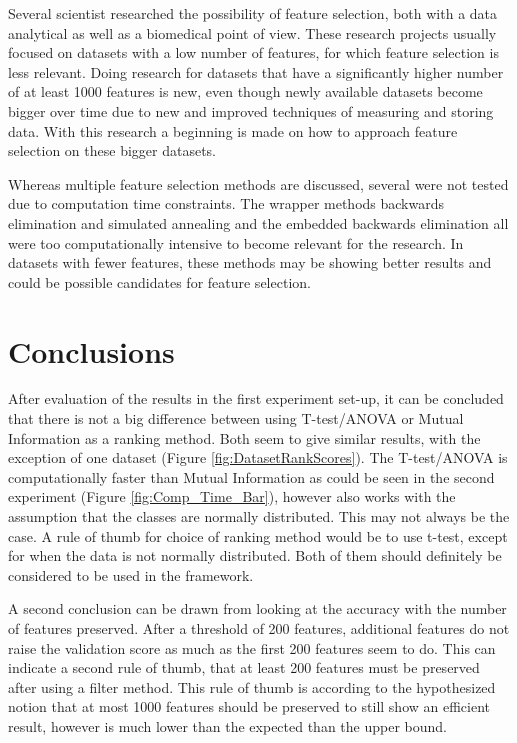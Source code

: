 \documentclass[10pt,a4paper]{article}
\begin{document}
	Several scientist researched the possibility of feature selection, both with a data analytical\cite{catal2009investigating} as well as a biomedical\cite{baumgartner2006data, welthagen2005comprehensive, liu2002comparative} point of view. These research projects usually focused on datasets with a low number of features, for which feature selection is less relevant. Doing research for datasets that have a significantly higher number of at least 1000 features is new, even though newly available datasets become bigger over time due to new and improved techniques of measuring and storing data. With this research a beginning is made on how to approach feature selection on these bigger datasets.
	
	Whereas multiple feature selection methods are discussed, several were not tested due to computation time constraints. The wrapper methods backwards elimination and simulated annealing and the embedded backwards elimination all were too computationally intensive to become relevant for the research. In datasets with fewer features, these methods may be showing better results and could be possible candidates for feature selection.
	
	
	\section{Conclusions}	
	\label{sec:Conclusions}
	
	After evaluation of the results in the first experiment set-up, it can be concluded that there is not a big difference between using T-test/ANOVA or Mutual Information as a ranking method. Both seem to give similar results, with the exception of one dataset (Figure \ref{fig:DatasetRankScores}). The T-test/ANOVA is computationally faster than Mutual Information as could be seen in the second experiment (Figure \ref{fig:Comp_Time_Bar}), however also works with the assumption that the classes are normally distributed. This may not always be the case. A rule of thumb for choice of ranking method would be to use t-test, except for when the data is not normally distributed. Both of them should definitely be considered to be used in the framework.
	
	A second conclusion can be drawn from looking at the accuracy with the number of features preserved. After a threshold of 200 features, additional features do not raise the validation score as much as the first 200 features seem to do. This can indicate a second rule of thumb, that at least 200 features must be preserved after using a filter method. This rule of thumb is according to the hypothesized notion that at most 1000 features should be preserved to still show an efficient result, however is much lower than the expected than the upper bound.
	
\end{document}
